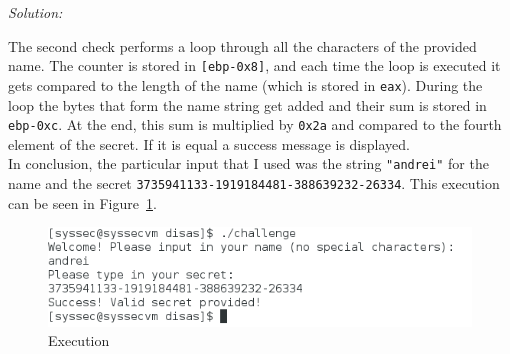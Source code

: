\documentclass[a4paper,11pt]{article}
\newenvironment{solution}%
{\par{\noindent\small\textit{Solution:}}\vspace{-12pt}\begin{framed}}%
{\end{framed}\par}
\begin{document}
\begin{solution}
  The second check performs a loop through all the characters of the provided name. The counter
  is stored in \texttt{[ebp-0x8]}, and each time the loop is executed it gets compared to the length
  of the name (which is stored in \texttt{eax}). During the loop the bytes that form the name string
  get added and their sum is stored in \texttt{ebp-0xc}. At the end, this sum is multiplied by \texttt{0x2a}
  and compared to the fourth element of the secret. If it is equal a success message is displayed.\\

  In conclusion, the particular input that I used was the string \texttt{"andrei"} for the name and
  the secret \texttt{3735941133-1919184481-388639232-26334}. This execution can be seen in Figure~\ref{fig:exe}.

\end{solution}\fi

\begin{figure} \center
  \includegraphics[width=0.8\linewidth]{disas.png}
  \caption{Execution}
  \label{fig:exe}
\end{figure}
\end{document}
